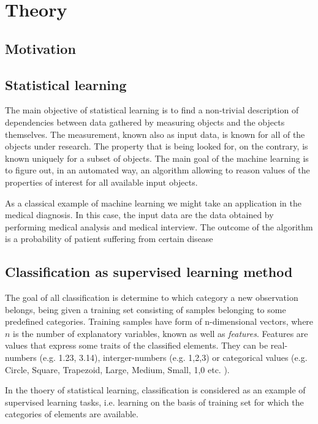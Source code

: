 \chapter{Theory}
\section{Motivation}
\section{Statistical learning}
The main objective of statistical learning is to find a non-trivial description of dependencies between data gathered by measuring objects and the objects themselves. The measurement, known also as input data, is known for all of the objects under research. The property that is being looked for, on the contrary, is known uniquely for a subset of objects. The main goal of the machine learning is to figure out, in an automated way, an algorithm allowing to reason values of the properties of interest for all available input objects.

As a classical example of machine learning we might take an application in the medical diagnosis. In this case, the input data are the data obtained by performing medical analysis and medical interview. The outcome of the algorithm is a probability of patient suffering from certain disease
\section{Classification as supervised learning method}
The goal of all classification is determine to which category a new observation belongs, being given a training set consisting of samples belonging to some predefined categories. Training samples have form of n-dimensional vectors, where $n$ is the number of explanatory variables, known as well as \textit{features}. Features are values that express some traits of the classified elements. They can be real-numbers (e.g. 1.23, 3.14), interger-numbers (e.g. 1,2,3) or categorical values (e.g. {Circle, Square, Trapezoid}, {Large, Medium, Small}, {1,0} etc. ).

In the thoery of statistical learning, classification is considered as an example of supervised learning tasks, i.e. learning on the basis of training set for which the categories of elements are available.



